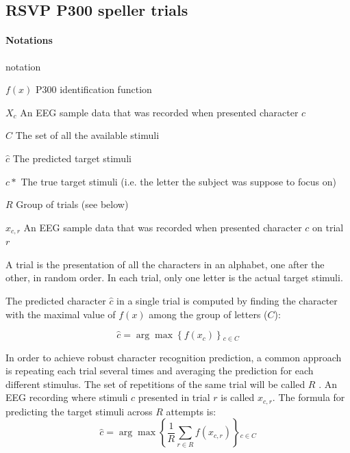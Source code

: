 \documentclass[
12pt, %
english, %
doublespacing, %
headsepline, %
]{MastersDoctoralThesis} %
\begin{document}
\subsection{RSVP P300 speller trials}

\paragraph{Notations}
\begin{labeling}{notation}
	\item [$f(x)$] P300 identification function
	\item [$X_c$] An EEG sample data that was recorded when presented character $c$
	\item [$C$] The set of all the available stimuli 
	\item [$\hat{c}$] The predicted target stimuli
	\item [$c*$] The true target stimuli (i.e. the letter the subject was suppose to focus on)	
	\item [$R$] Group of trials (see below)
	\item [$x_{c,r}$] An EEG sample data that was recorded when presented character $c$ on trial $r$
\end{labeling}

A trial is the presentation of all the characters in an alphabet, one after the other, in random order. In each trial, only one letter is the actual target stimuli.  

The predicted character $\hat{c}$ in a single trial is computed by finding the character with the maximal value of $f(x)$ among the group of letters ($C$):


\begin{equation}
\hat{c} = \arg \max \left\{ {f\left( {{x_{c}}} \right)} \right\}{  _{c \in C}}
\end{equation}

In order to achieve robust character recognition prediction, a common approach is repeating each trial several times and averaging the prediction for each different stimulus. The set of repetitions of the same trial will be called $R$ . An EEG recording where stimuli $c$ presented in trial $r$ is called $x_{c,r}$. The formula for predicting the target stimuli across $R$ attempts is:
\begin{equation}
\hat c = \arg \max \left\{ {\frac{1}{R}\sum\limits_{r \in R}^{} {f\left( {{x_{c,r}}} \right)} } \right\}{_{c \in C}}
\end{equation}
\end{document}
